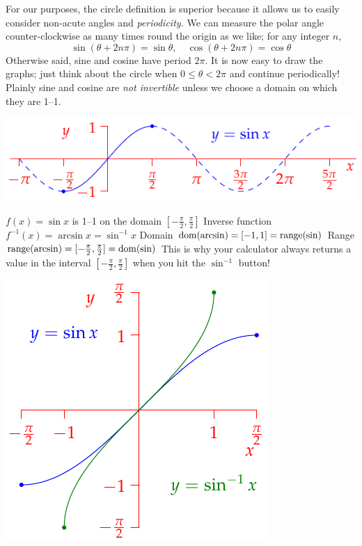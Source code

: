 For our purposes, the circle definition is superior because it allows us to easily consider non-acute angles and \emph{periodicity.} We can measure the polar angle counter-clockwise as many times round the origin as we like; for any integer $n$,
\[\sin(\theta+2n\pi)=\sin\theta,\quad \cos(\theta+2n\pi)=\cos\theta\]
Otherwise said, sine and cosine have period $2\pi$. It is now easy to draw the graphs; just think about the circle when $0\le \theta<2\pi$ and continue periodically! Plainly sine and cosine are \emph{not invertible} unless we choose a domain on which they are 1--1.\par
\begin{minipage}[t]{0.6\textwidth}\vspace{-3pt}
\includegraphics[scale=0.95]{invsine2}\par
$f(x)=\sin x$ is 1--1 on the domain $[-\frac\pi 2,\frac\pi 2]$\smallbreak
Inverse function $f^{-1}(x)=\arcsin x=\sin^{-1}x$\smallbreak
Domain $\operatorname{dom}(\arcsin)=[-1,1] =\operatorname{range}(\sin)$\smallbreak
Range $\operatorname{range}(\arcsin)=[-\frac\pi 2,\frac\pi 2]=\operatorname{dom}(\sin)$\medbreak
This is why your calculator always returns a value in the interval $[-\frac\pi 2,\frac\pi 2]$ when you hit the $\sin^{-1}$ button!
\end{minipage}\begin{minipage}[t]{0.4\textwidth}\vspace{-5pt}
\flushright\includegraphics[scale=0.93]{invsine}
\end{minipage}


